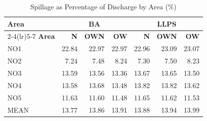 \begin{table}[htbp]
\centering
\caption{Spillage as Percentage of Discharge by Area (\%)}
\label{tab:spillage_percentage}
\small
\begin{tabular}{lrrrrrr}
\toprule
\textbf{Area} & \multicolumn{3}{c}{\textbf{BA}} & \multicolumn{3}{c}{\textbf{LLPS}} \\
\cmidrule(lr){2-4}\cmidrule(lr){5-7}
\textbf{Area} & \textbf{N} & \textbf{OWN} & \textbf{OW} & \textbf{N} & \textbf{OWN} & \textbf{OW} \\
\midrule
NO1 & 22.84 & 22.97 & 22.97 & 22.96 & 23.09 & 23.07 \\
NO2 & 7.24 & 7.48 & 8.24 & 7.30 & 7.50 & 8.23 \\
NO3 & 13.59 & 13.56 & 13.36 & 13.67 & 13.65 & 13.50 \\
NO4 & 13.58 & 13.68 & 13.48 & 13.82 & 13.82 & 13.62 \\
NO5 & 11.63 & 11.60 & 11.48 & 11.65 & 11.62 & 11.53 \\
MEAN & 13.77 & 13.86 & 13.91 & 13.88 & 13.94 & 13.99 \\
\bottomrule
\end{tabular}
\end{table}